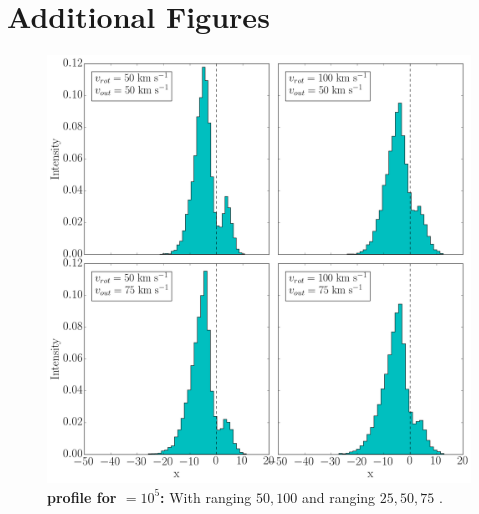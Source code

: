 \appendix
\setcounter{chapter}{0}
\renewcommand{\chaptername}{Appendix}
\renewcommand{\theequation}{\Alph{chapter}.\arabic{section}.\arabic{equation}} 
\setcounter{equation}{0}

\chapter{Additional Figures}
\label{first_plots}

\begin{figure}[h!]
	\begin{center}
		\includegraphics[width=1\textwidth]{./figures/chapter3/2_tau10E5_phi83-90}
	\end{center}
	\caption{\textbf{\lya profile for \tauh$=10^5$:} With \vrot ranging $50,100$ \kms and \vout ranging $25,50,75$ \kms.
		\label{fig:2_tau10E5_phi83-90}}
\end{figure}

\newpage

